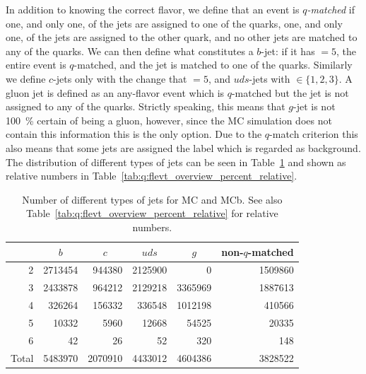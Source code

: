 In addition to knowing the correct flavor, we define that an event is \emph{$q$-matched} if one, and only one, of the jets are assigned to one of the quarks, one, and only one, of the jets are assigned to the other quark, and no other jets are matched to any of the quarks. We can then define what constitutes a $b$-jet: if it has  $= 5$, the entire event is $q$-matched, and the jet is matched to one of the quarks. Similarly we define $c$-jets only with the change that  $= 5$, and $uds$-jets with  $\in \{1, 2, 3\}$. A gluon jet is defined as an any-flavor event which is $q$-matched but the jet is not assigned to any of the quarks. Strictly speaking, this means that $g$-jet is not \SI{100}{\percent} certain of being a gluon, however, since the MC simulation does not contain this information this is the only option. Due to the $q$-match criterion this also means that some jets are assigned the label  which is regarded as background. The distribution of different types of jets can be seen in Table~\ref{tab:q:flevt_overview} and shown as relative numbers in Table~\ref{tab:q:flevt_overview_percent_relative}.

\begin{table}[h!]
  \centering
  \begin{tabular}{@{}rrrrrr@{}}
    {}    & \multicolumn{1}{c}{$b$} & \multicolumn{1}{c}{$c$} & \multicolumn{1}{c}{$uds$} & \multicolumn{1}{c}{$g$} & non-$q$-matched    \\ 
    \midrule
    2     & \num{2713454} &  \num{944380} & \num{2125900} &       \num{0} & \num{1509860} \\
    3     & \num{2433878} &  \num{964212} & \num{2129218} & \num{3365969} & \num{1887613} \\
    4     &  \num{326264} &  \num{156332} &  \num{336548} & \num{1012198} &  \num{410566} \\
    5     &   \num{10332} &    \num{5960} &   \num{12668} &   \num{54525} &   \num{20335} \\
    6     &      \num{42} &      \num{26} &      \num{52} &     \num{320} &     \num{148} \\
    \midrule
    Total & \num{5483970} & \num{2070910} & \num{4433012} & \num{4604386} & \num{3828522} \\
  \end{tabular}
  \caption{Number of different types of jets for MC and MCb. See also Table~\ref{tab:q:flevt_overview_percent_relative} for relative numbers.}
  \label{tab:q:flevt_overview}
\end{table}

